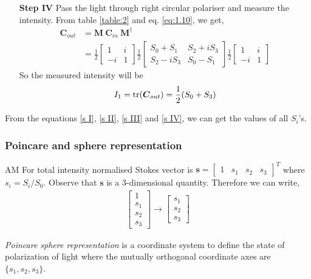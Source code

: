 \documentclass[11pt,a4paper]{article}
\numberwithin{equation}{section}
\begin{document}
\begin{enumerate}
  \item[\textbf{Step IV}] 
 Pass the light through right circular polariser and measure the intensity. From table \ref{table:2} and eq. \ref{eq:1.10}, we get,
 \begin{align}
 	\boldsymbol{C}_{out} &= \boldsymbol{M}\:\boldsymbol{C}_{in}\:\boldsymbol{M}^\dagger\nonumber\\
 	&=\frac{1}{2}\begin{bmatrix} 1 & i \\ -i & 1 \end{bmatrix} 
 	\frac{1}{2} \begin{bmatrix} S_0+S_1 & S_2+iS_3 \\ S_2-iS_3 & S_0-S_1\end{bmatrix}
 	\frac{1}{2}\begin{bmatrix} 1 & i \\ -i & 1 \end{bmatrix}
 \end{align}
 So the measured intensity will be 
 \begin{align}
 	I_1 = \tr(\boldsymbol{C}_{out}) = \frac{1}{2} (S_0+S_3) \label{s IV}
 \end{align}
 \end{enumerate}

From the equations \ref{s I}, \ref{s II}, \ref{s III} and \ref{s IV}, we can get the values of all $S_i$'s.
\subsubsection{Poincare  and sphere representation}AM
For total intensity normalised Stokes vector is $\boldsymbol{s}= \begin{bmatrix} 1& s_1& s_2& s_3\end{bmatrix}^T$ where $s_i=S_i/S_0$. Observe that $ \boldsymbol{s} $ is a 3-dimensional quantity. Therefore we can write, 
\begin{align*}
	\begin{bmatrix} 1\\ s_1\\ s_2\\ s_3\end{bmatrix} \rightarrow 
	\begin{bmatrix} s_1\\ s_2\\ s_3\end{bmatrix}
\end{align*}

\textit{Poincare sphere representation} is a coordinate system to define the state of polarization of light where the mutually orthogonal coordinate axes are $\{ s_1, s_2, s_3 \}$.
\begin{center}
	\label{fig:poincare}
\end{center}
\end{document}
